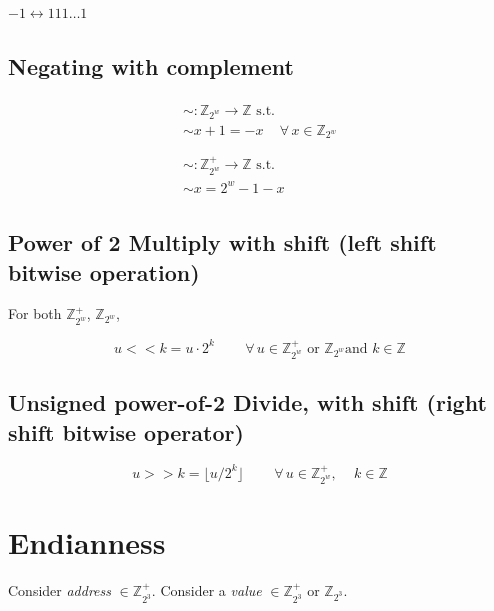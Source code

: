 \documentclass[10pt]{amsart}
\begin{document}
$-1 \leftrightarrow 111 \dots 1$


\subsection{Negating with complement}

\begin{equation}
\begin{gathered}
\begin{gathered} 
\sim : \mathbb{Z}_{2^w} \to \mathbb{Z} \text{ s.t. } \\
\sim x + 1 = -x \quad \, \forall \, x \in \mathbb{Z}_{2^w} \\
\end{gathered}  \\
\begin{gathered} 
\sim : \mathbb{Z}^+_{2^w} \to \mathbb{Z} \text{ s.t. } \\
\sim x = 2^w- 1 -x 
\end{gathered}
\end{gathered}
\end{equation}

\subsection{Power of 2 Multiply with shift (left shift bitwise operation) }

For both $\mathbb{Z}^+_{2^w}$, $\mathbb{Z}_{2^w}$, 

\begin{equation}
u << k = u \cdot 2^k \qquad \, \forall \, u \in \mathbb{Z}^+_{2^w} \text{ or } \mathbb{Z}_{2^w} \text{and } k \in \mathbb{Z}
\end{equation}

\subsection{Unsigned power-of-2 Divide, with shift (right shift bitwise operator)}

\begin{equation}
u >> k = \lfloor u / 2^k \rfloor \qquad \, \forall \, u \in \mathbb{Z}^+_{2^w}, \quad \, k \in \mathbb{Z}  
\end{equation}

\section{Endianness} 

Consider \emph{address} $\in \mathbb{Z}^+_{2^3}$.  Consider a \emph{value} $\in \mathbb{Z}^+_{2^3}$ or $\mathbb{Z}_{2^3}$. 
\end{document}
